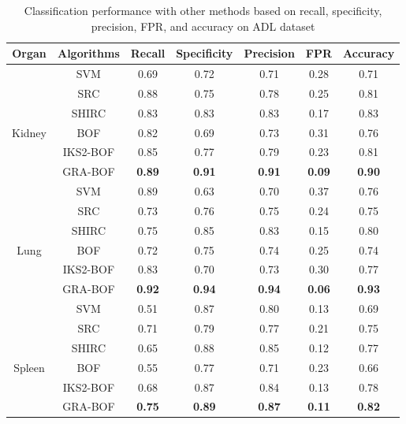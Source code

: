 \begin{table}[h]
\centering
\caption[Classification performance with other methods based on recall, specificity, precision, FPR, and accuracy]{\fontsize{10pt}{12pt}\selectfont Classification performance with  other methods based on  recall, specificity, precision, FPR, and accuracy on ADL dataset}
    \label{ch5:tab:adlp}
\renewcommand{\arraystretch}{1.2} 
{\scriptsize
\begin{tabular}{|c|c|c|c|c|c|c|}
\hline
    Organ &    Algorithms    &    Recall    &Specificity    &Precision    &    FPR    &    Accuracy    \\
\hline
    &    SVM    &    0.69    &    0.72    &    0.71    &    0.28    &    0.71    \\
    &    SRC    &    0.88    &    0.75    &    0.78    &    0.25    &    0.81    \\
    &    SHIRC    &    0.83    &    0.83    &    0.83    &    0.17    &    0.83    \\
Kidney    &    BOF    &    0.82    &    0.69    &    0.73    &    0.31    &    0.76    \\
    &    IKS2-BOF    &    0.85    &    0.77    &    0.79    &    0.23    &    0.81    \\
    &    GRA-BOF    &\textbf{    0.89    }&\textbf{    0.91    }&\textbf{    0.91    }&\textbf{    0.09    }&\textbf{    0.90    }\\
\hline    
&    SVM    &    0.89    &    0.63    &    0.70    &    0.37    &    0.76    \\
    &    SRC    &    0.73    &    0.76    &    0.75    &    0.24    &    0.75    \\
    &    SHIRC    &    0.75    &    0.85    &    0.83    &    0.15    &    0.80    \\
Lung    &    BOF    &    0.72    &    0.75    &    0.74    &    0.25    &    0.74    \\
    &    IKS2-BOF    &    0.83    &    0.70    &    0.73    &    0.30    &    0.77    \\
    &    GRA-BOF    &\textbf{    0.92    }&\textbf{    0.94    }&\textbf{    0.94    }&\textbf{    0.06    }&\textbf{    0.93    }\\
\hline    
&    SVM    &    0.51    &    0.87    &    0.80    &    0.13    &    0.69    \\
    &    SRC    &    0.71    &    0.79    &    0.77    &    0.21    &    0.75    \\
    &    SHIRC    &    0.65    &    0.88    &    0.85    &    0.12    &    0.77    \\
Spleen    &    BOF    &    0.55    &    0.77    &    0.71    &    0.23    &    0.66    \\
    &    IKS2-BOF    &    0.68    &    0.87    &    0.84    &    0.13    &    0.78    \\
    &    GRA-BOF    &\textbf{    0.75    }&\textbf{    0.89    }&\textbf{    0.87    }&\textbf{    0.11    }&\textbf{    0.82    }\\
\hline
\end{tabular}
}
\end{table}

